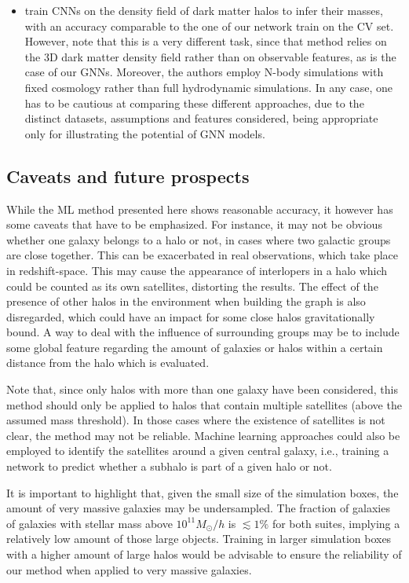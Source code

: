 \documentclass[twocolumn]{aastex631}
\begin{document}
\begin{itemize}
\item \cite{2020arXiv201110577L} train CNNs on the density field of dark matter halos to infer their masses, with an accuracy comparable to the one of our network train on the CV set. However, note that this is a very different task, since that method relies on the 3D dark matter density field rather than on observable features, as is the case of our GNNs. Moreover, the authors employ N-body simulations with fixed cosmology rather than full hydrodynamic simulations. In any case, one has to be cautious at comparing these different approaches, due to the distinct datasets, assumptions and features considered, being appropriate only for illustrating the potential of GNN models.

\end{itemize}

\subsection{Caveats and future prospects}


While the ML method presented here shows reasonable accuracy, it however has some caveats that have to be emphasized. For instance, it may not be obvious whether one galaxy belongs to a halo or not, in cases where two galactic groups are close together. This can be exacerbated in real observations, which take place in redshift-space. This may cause the appearance of interlopers in a halo which could be counted as its own satellites, distorting the results. The effect of the presence of other halos in the environment when building the graph is also disregarded, which could have an impact for some close halos gravitationally bound. A way to deal with the influence of surrounding groups may be to include some global feature regarding the amount of galaxies or halos within a certain distance from the halo which is evaluated.

Note that, since only halos with more than one galaxy have been considered, this method should only be applied to halos that contain multiple satellites (above the assumed mass threshold). In those cases where the existence of satellites is not clear, the method may not be reliable. Machine learning approaches could also be employed to identify the satellites around a given central galaxy, i.e., training a network to predict whether a subhalo is part of a given halo or not.

It is important to highlight that, given the small size of the simulation boxes, the amount of very massive galaxies may be undersampled. The fraction of galaxies of galaxies with stellar mass above $10^{11} M_\odot/h$ is $\lesssim 1\%$ for both suites, implying a relatively low amount of those large objects. Training in larger simulation boxes with a higher amount of large halos would be advisable to ensure the reliability of our method when applied to very massive galaxies.
\end{document}
